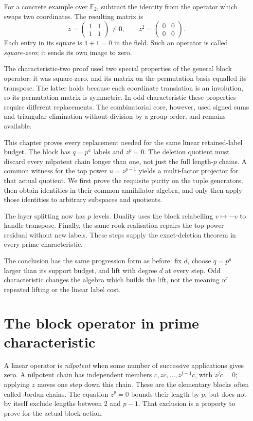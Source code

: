 \documentclass[11pt,a4paper,oneside,openany]{book}
\theoremstyle{definition}\newtheorem{definition}[theorem]{Definition}
\theoremstyle{remark}\newtheorem{remark}[theorem]{Remark}
\numberwithin{equation}{chapter}
\begin{document}
For a concrete example over $\mathbb F_2$, subtract the identity
from the operator which swaps two coordinates. The resulting matrix is
\[
 z=\begin{pmatrix}1&1\\1&1\end{pmatrix}\ne0,
 \qquad z^2=\begin{pmatrix}0&0\\0&0\end{pmatrix}.
\]
Each entry in its square is $1+1=0$ in the field. Such an operator is
called \emph{square-zero}; it sends its own image to zero.

The characteristic-two proof used two special properties of the
general block operator: it was square-zero, and its matrix on the
permutation basis equalled its transpose. The latter holds because
each coordinate translation is an involution, so its permutation
matrix is symmetric. In odd characteristic these properties require
different replacements. The combinatorial core, however, used signed
sums and triangular elimination without division by a group order,
and remains available.

This chapter proves every replacement needed for the same linear
retained-label budget. The block has $q=p^a$ labels and $z^p=0$.
The deletion quotient must discard every nilpotent chain longer than
one, not just the full length-$p$ chains. A common witness for the
top power $u=z^{p-1}$ yields a multi-factor projector for that actual
quotient. We first prove the requisite purity on the tuple generators,
then obtain identities in their common annihilator algebra, and only
then apply those identities to arbitrary subspaces and quotients.

The layer splitting now has $p$ levels. Duality uses the block
relabelling $v\mapsto-v$ to handle transpose. Finally, the same rook
realisation repairs the top-power residual without new labels.
These steps supply the exact-deletion theorem in every prime
characteristic.

The conclusion has the same progression form as before: fix $d$,
choose $q=p^a$ larger than its support budget, and lift with degree $d$
at every step. Odd characteristic changes the algebra which builds the
lift, not the meaning of repeated lifting or the linear label cost.

\section{The block operator in prime characteristic}
A linear operator is \emph{nilpotent} when some number of successive
applications gives zero. A nilpotent chain has independent members
$c,zc,\ldots,z^{j-1}c$, with $z^jc=0$; applying $z$ moves one step
down this chain. These are the elementary blocks often called Jordan
chains. The equation $z^p=0$ bounds their length by $p$, but does not
by itself exclude lengths between $2$ and $p-1$. That exclusion is
a property to prove for the actual block action.
\end{document}
